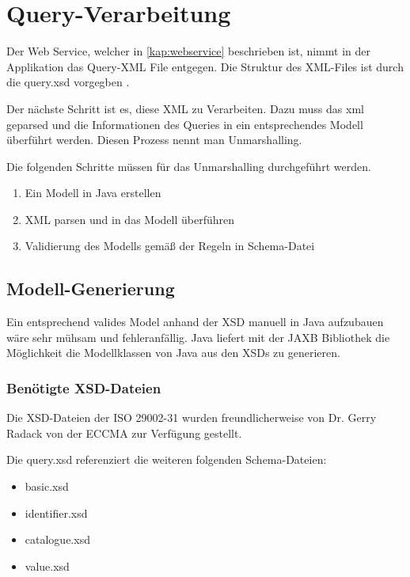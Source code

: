 % 
\section{Query-Verarbeitung}

Der \gls{Web Service}, welcher in \autoref{kap:webservice} beschrieben ist, nimmt in der Applikation das Query-XML File entgegen. 
Die Struktur des XML-Files ist durch die query.xsd vorgegben \citep[27]{iso29002-31}. 

Der nächste Schritt ist es, diese XML zu Verarbeiten. Dazu muss das xml geparsed und die Informationen des Queries in ein entsprechendes Modell überführt werden. Diesen Prozess nennt man \gls{Unmarshalling}. 

Die folgenden Schritte müssen für das Unmarshalling durchgeführt werden.

\begin{enumerate}
\item Ein Modell in Java erstellen
\item XML parsen und in das Modell überführen
\item Validierung des Modells gemäß der Regeln in Schema-Datei
\end{enumerate}

\subsection{Modell-Generierung}

Ein entsprechend valides Model anhand der XSD manuell in Java aufzubauen wäre sehr mühsam und fehleranfällig. Java liefert mit der JAXB Bibliothek die Möglichkeit die Modellklassen von Java aus den XSDs zu generieren.

\subsubsection{Benötigte XSD-Dateien}

Die XSD-Dateien der ISO 29002-31 wurden freundlicherweise von Dr. Gerry Radack von der ECCMA zur Verfügung gestellt. 

Die query.xsd referenziert die weiteren folgenden Schema-Dateien:
\begin{itemize}
\item basic.xsd
\item identifier.xsd
\item catalogue.xsd
\item value.xsd
\end{itemize}

